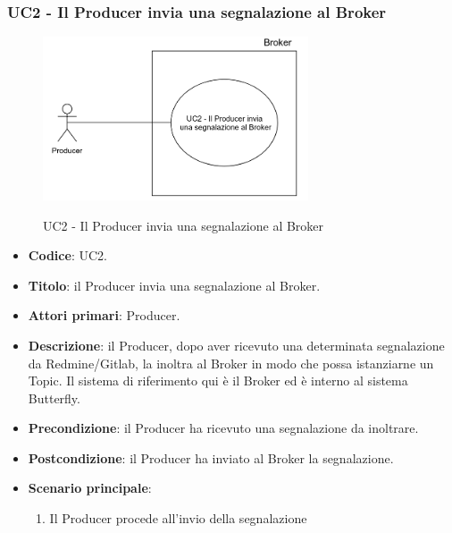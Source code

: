 \subsubsection{UC2 - Il Producer invia una segnalazione al Broker}
	\begin{figure}[H]
		\centering
		\includegraphics[width=0.7\textwidth]{img/UC2-ProducerBroker.png}\\
		\caption{UC2 - Il Producer invia una segnalazione al Broker}
	\end{figure}
	\begin{itemize}
		\item \textbf{Codice}: UC2.
		\item \textbf{Titolo}: il Producer invia una segnalazione al Broker.
		\item \textbf{Attori primari}: Producer.
		\item \textbf{Descrizione}: il Producer, dopo aver ricevuto una determinata segnalazione da Redmine/Gitlab, la inoltra al Broker in modo che possa istanziarne un Topic. Il sistema di riferimento qui è il Broker ed è interno al sistema Butterfly.
		\item \textbf{Precondizione}: il Producer ha ricevuto una segnalazione da inoltrare.
		\item \textbf{Postcondizione}: il Producer ha inviato al Broker la segnalazione.
		\item \textbf{Scenario principale}:
		\begin{enumerate}
			\item Il Producer procede all'invio della segnalazione
		\end{enumerate}
		 
	\end{itemize}


